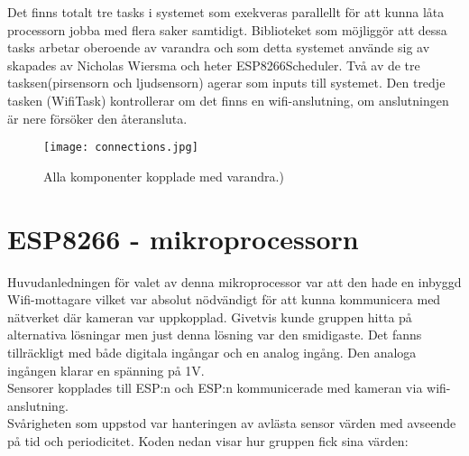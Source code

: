 Det finns totalt tre tasks i systemet som exekveras parallellt för att kunna låta processorn jobba med flera saker samtidigt. Biblioteket som möjliggör att dessa tasks arbetar oberoende av varandra och som detta systemet använde sig av skapades av Nicholas Wiersma och heter ESP8266Scheduler. Två av de tre tasksen(pirsensorn och ljudsensorn) agerar som inputs till systemet. Den tredje tasken (WifiTask) kontrollerar om det finns en wifi-anslutning, om anslutningen är nere försöker den återansluta.

\begin{figure}[h]

  \texttt{[image: connections.jpg]}
  \caption{Alla komponenter kopplade med varandra.)}
  \label{fig:connections}
\end{figure}



\section{ESP8266 - mikroprocessorn}
Huvudanledningen för valet av denna mikroprocessor var att den hade en inbyggd Wifi-mottagare vilket var absolut nödvändigt för att kunna kommunicera med nätverket där kameran var uppkopplad. Givetvis kunde gruppen hitta på alternativa lösningar men just denna lösning var den smidigaste. Det fanns tillräckligt med både digitala ingångar och en analog ingång. Den analoga ingången klarar en spänning på 1V.\\

Sensorer kopplades till ESP:n och ESP:n kommunicerade med kameran via wifi-anslutning.\\

Svårigheten som uppstod var hanteringen av avlästa sensor värden med avseende på tid och periodicitet. Koden nedan visar hur gruppen fick sina värden:

